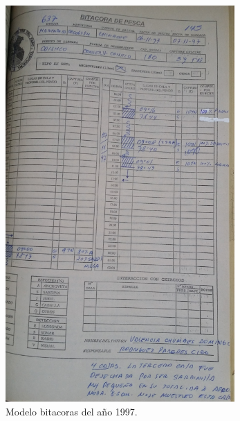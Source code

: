 \documentclass[a4paper,oneside,11pt]{book}
\begin{document}
\begin{figure}
\centering
\includegraphics[width=0.8\linewidth]{imagen_Manual_PBP/antig}
\caption{Modelo bitacoras del año 1997.}
\label{fig:inter}
\end{figure}
\end{document}
